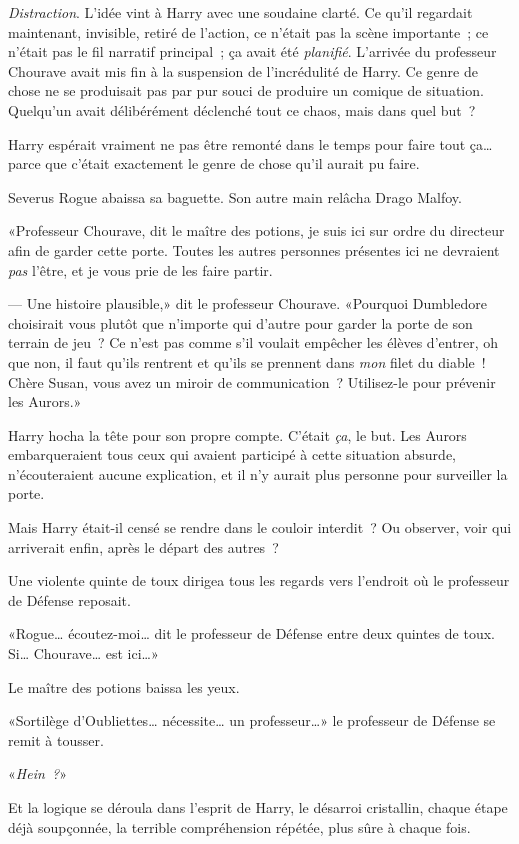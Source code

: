 \emph{Distraction}. L'idée vint à Harry avec une soudaine clarté. Ce qu'il regardait maintenant, invisible, retiré de l'action, ce n'était pas la scène importante~; ce n'était pas le fil narratif principal~; ça avait été \emph{planifié}. L'arrivée du professeur Chourave avait mis fin à la suspension de l'incrédulité de Harry. Ce genre de chose ne se produisait pas par pur souci de produire un comique de situation. Quelqu'un avait délibérément déclenché tout ce chaos, mais dans quel but~?

Harry espérait vraiment ne pas être remonté dans le temps pour faire tout ça… parce que c'était exactement le genre de chose qu'il aurait pu faire.

Severus Rogue abaissa sa baguette. Son autre main relâcha Drago Malfoy.

«Professeur Chourave, dit le maître des potions, je suis ici sur ordre du directeur afin de garder cette porte. Toutes les autres personnes présentes ici ne devraient \emph{pas} l'être, et je vous prie de les faire partir.

--- Une histoire plausible,» dit le professeur Chourave. «Pourquoi Dumbledore choisirait vous plutôt que n'importe qui d'autre pour garder la porte de son terrain de jeu~? Ce n'est pas comme s'il voulait empêcher les élèves d'entrer, oh que non, il faut qu'ils rentrent et qu'ils se prennent dans \emph{mon} filet du diable~! Chère Susan, vous avez un miroir de communication~? Utilisez-le pour prévenir les Aurors.»

Harry hocha la tête pour son propre compte. C'était \emph{ça}, le but. Les Aurors embarqueraient tous ceux qui avaient participé à cette situation absurde, n'écouteraient aucune explication, et il n'y aurait plus personne pour surveiller la porte.

Mais Harry était-il censé se rendre dans le couloir interdit~? Ou observer, voir qui arriverait enfin, après le départ des autres~?

Une violente quinte de toux dirigea tous les regards vers l'endroit où le professeur de Défense reposait.

«Rogue… écoutez-moi… dit le professeur de Défense entre deux quintes de toux. Si… Chourave… est ici…»

Le maître des potions baissa les yeux.

«Sortilège d'Oubliettes… nécessite… un professeur…» le professeur de Défense se remit à tousser.

«\emph{Hein~?}»

Et la logique se déroula dans l'esprit de Harry, le désarroi cristallin, chaque étape déjà soupçonnée, la terrible compréhension répétée, plus sûre à chaque fois.

